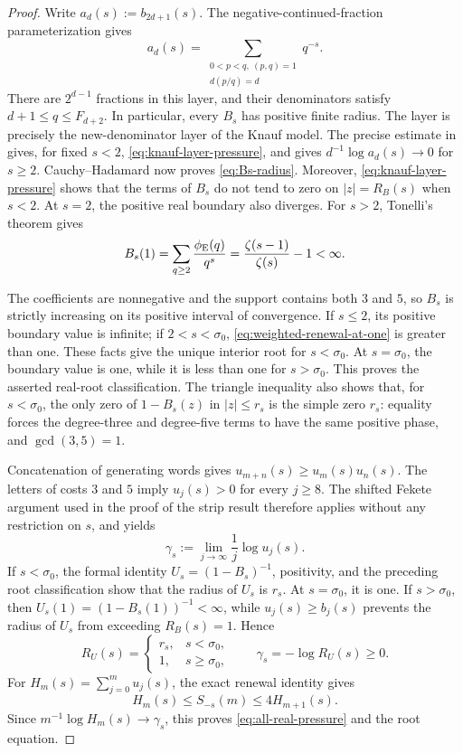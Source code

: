 \begin{proof}
Write \(a_d(s):=b_{2d+1}(s)\).  The negative-continued-fraction
parameterization gives
\[
 a_d(s)=\sum_{\substack{0<p<q,\ (p,q)=1\\d(p/q)=d}}q^{-s}.
\]
There are \(2^{d-1}\) fractions in this layer, and their denominators satisfy
\(d+1\le q\le F_{d+2}\).  In particular, every \(B_s\) has positive finite
radius.  The layer is precisely the new-denominator layer of the Knauf model.
The precise estimate in  gives, for fixed
\(s<2\), \eqref{eq:knauf-layer-pressure}, and gives
\(d^{-1}\log a_d(s)\to0\) for \(s\ge2\).  Cauchy--Hadamard now proves
\eqref{eq:Bs-radius}.  Moreover, \eqref{eq:knauf-layer-pressure} shows that
the terms of \(B_s\) do not tend to zero on \(|z|=R_B(s)\) when \(s<2\).
At \(s=2\), the positive real boundary also diverges.  For \(s>2\), Tonelli's
theorem gives
\begin{equation}
 B_s(1)=\sum_{q\ge2}\frac{\phi_{\rm E}(q)}{q^s}
 =\frac{\zeta(s-1)}{\zeta(s)}-1<\infty.
 \label{eq:weighted-renewal-at-one}
\end{equation}

The coefficients are nonnegative and the support contains both \(3\) and
\(5\), so \(B_s\) is strictly increasing on its positive interval of
convergence.  If \(s\le2\), its positive boundary value is infinite; if
\(2<s<\sigma_0\), \eqref{eq:weighted-renewal-at-one} is greater than one.
These facts give the unique interior root for \(s<\sigma_0\).  At
\(s=\sigma_0\), the boundary value is one, while it is less than one for
\(s>\sigma_0\).  This proves the asserted real-root classification.  The
triangle inequality also shows that, for \(s<\sigma_0\), the only zero of
\(1-B_s(z)\) in \(|z|\le r_s\) is the simple zero \(r_s\): equality forces
the degree-three and degree-five terms to have the same positive phase, and
\(\gcd(3,5)=1\).

Concatenation of generating words gives
\(u_{m+n}(s)\ge u_m(s)u_n(s)\).  The letters of costs \(3\) and \(5\) imply
\(u_j(s)>0\) for every \(j\ge8\).  The shifted Fekete argument used in the
proof of the strip result therefore applies without any restriction on
\(s\), and yields
\[
 \gamma_s:=\lim_{j\to\infty}\frac1j\log u_j(s).
\]
If \(s<\sigma_0\), the formal identity
\(U_s=(1-B_s)^{-1}\), positivity, and the preceding root classification show
that the radius of \(U_s\) is \(r_s\).  At \(s=\sigma_0\), it is one.  If
\(s>\sigma_0\), then \(U_s(1)=(1-B_s(1))^{-1}<\infty\), while
\(u_j(s)\ge b_j(s)\) prevents the radius of \(U_s\) from exceeding
\(R_B(s)=1\).  Hence
\[
 R_U(s)=\begin{cases}r_s,&s<\sigma_0,\\1,&s\ge\sigma_0,
 \end{cases}
 \qquad \gamma_s=-\log R_U(s)\ge0.
\]
For \(H_m(s)=\sum_{j=0}^m u_j(s)\), the exact renewal identity gives
\[
 H_m(s)\le S_{-s}(m)\le4H_{m+1}(s).
\]
Since \(m^{-1}\log H_m(s)\to\gamma_s\), this proves
\eqref{eq:all-real-pressure} and the root equation.


\end{proof}
